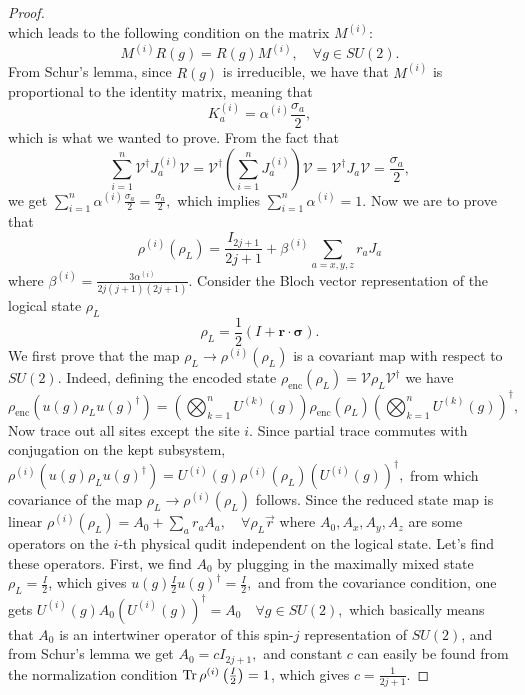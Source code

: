 \documentclass[11pt,letterpaper]{article}
\theoremstyle{plain}
\theoremstyle{plain}
\theoremstyle{plain}
\theoremstyle{plain}
\theoremstyle{plain}
\theoremstyle{plain}
\theoremstyle{plain}
\theoremstyle{definition}
\theoremstyle{plain}
\begin{document}
\begin{proof}
\[    \]
    which leads to the following condition on the matrix $M^{(i)}$:
    \[
    M^{(i)} R(g)=R(g) M^{(i)}, \quad \forall g \in SU(2).
    \]
    From Schur's lemma, since $R(g)$ is irreducible, we have that $M^{(i)}$ is proportional to the identity matrix, meaning that
    \[
    K_a^{(i)}=\alpha^{(i)} \frac{\sigma_a}{2},
    \]
    which is what we wanted to prove. From the fact that 
    \[
    \sum_{i=1}^n \mathcal{V}^{\dagger} J_a^{(i)} \mathcal{V} = \mathcal{V}^{\dagger} \left(\sum_{i=1}^n J_a^{(i)}\right) \mathcal{V} = \mathcal{V}^{\dagger} J_a \mathcal{V} = \frac{\sigma_a}{2},
    \]
    we get
    $
    \sum_{i=1}^n \alpha^{(i)} \frac{\sigma_a}{2} = \frac{\sigma_a}{2},
    $
    which implies $\sum_{i=1}^n \alpha^{(i)} = 1$.
    Now we are to prove that
    \begin{equation}\label{supple_reduced_state}
        \rho^{(i)}\left(\rho_L\right)=\frac{I_{2 j+1}}{2 j+1}+\beta^{(i)} \sum_{a=x, y, z} r_a J_a
    \end{equation}
    where
    $
        \beta^{(i)}=\frac{3 \alpha^{(i)}}{2 j(j+1)(2 j+1)}.
    $
    Consider the Bloch vector representation of the logical state $\rho_L$ 
    \[
    \rho_L=\frac{1}{2}(I+\mathbf{r} \cdot \boldsymbol{\sigma}).
    \]
    We first prove that the map $\rho_L \rightarrow \rho^{(i)}\left(\rho_L\right)$ is a covariant map with respect to $SU(2)$. Indeed,
    defining the encoded state
    $
    \rho_{\mathrm{enc}}\left(\rho_L\right)=\mathcal{V} \rho_L \mathcal{V}^{\dagger}
    $
    we have
    \[
    \rho_{\text{enc}}\left(u(g) \rho_L u(g)^{\dagger}\right)=\left(\bigotimes_{k=1}^n U^{(k)}(g)\right)\rho_{\text{enc}}\left(\rho_L\right) \left(\bigotimes_{k=1}^n U^{(k)}(g)\right)^{\dagger},
    \]
    Now trace out all sites except the site $i$. Since partial trace commutes with conjugation on the kept subsystem,
    $
    \rho^{(i)}\left(u(g) \rho_L u(g)^{\dagger}\right)=U^{(i)}(g) \rho^{(i)}\left(\rho_L\right) (U^{(i)}(g))^{\dagger},
    $
    from which covariance of the map $\rho_L \rightarrow \rho^{(i)}\left(\rho_L\right)$ follows.
    Since the reduced state map is linear
    $
        \rho^{(i)}\left(\rho_L\right)=A_0+\sum_a r_a A_a, \quad \forall \rho_L  \vec{r}
    $
    where $A_0, A_x, A_y, A_z$ are some operators on the $i$-th physical qudit independent on the logical state. Let's find these operators. 
    First, we find $A_0$ by plugging in the maximally mixed state $\rho_L = \frac{I}{2}$, which gives
    $
    u(g) \frac{I}{2} u(g)^{\dagger}=\frac{I}{2},
    $
    and from the covariance condition, one gets
    $
    U^{(i)}(g) A_0 (U^{(i)}(g))^{\dagger}=A_0 \quad \forall g \in SU(2),
    $
    which basically means that $A_0$ is an intertwiner operator of this spin-$j$ representation of $SU(2)$, and from Schur's lemma we get
    $
    A_0=c I_{2 j+1},
    $
    and constant $c$ can easily be found from the normalization condition $\Tr \rho^{(i)}\left(\frac{I}{2}\right)=1$, which gives $c=\frac{1}{2 j+1}$. 
    

\end{proof}
\end{document}
